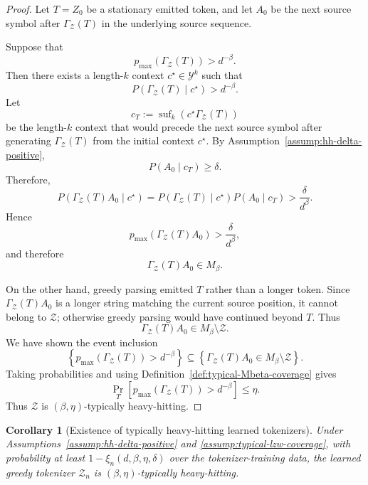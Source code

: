 \documentclass{article}
\theoremstyle{plain}
\newtheorem{corollary}[theorem]{Corollary}
\theoremstyle{definition}
\theoremstyle{remark}
\begin{document}
    \begin{proof}
    Let $T=Z_0$ be a stationary emitted token, and let $A_0$ be the next source
    symbol after $\Gamma_{\mathcal Z}(T)$ in the underlying source sequence.
    
    Suppose that
    \[
        p_{\max}\!\left(\Gamma_{\mathcal Z}(T)\right)>d^{-\beta}.
    \]
    Then there exists a length-$k$ context $c^\star\in\mathcal Y^k$ such that
    \[
        P(\Gamma_{\mathcal Z}(T)\mid c^\star)>d^{-\beta}.
    \]
    Let
    \[
        c_T
        :=
        \operatorname{suf}_k\!\left(c^\star\Gamma_{\mathcal Z}(T)\right)
    \]
    be the length-$k$ context that would precede the next source symbol after
    generating $\Gamma_{\mathcal Z}(T)$ from the initial context $c^\star$. By
    Assumption~\ref{assump:hh-delta-positive},
    \[
        P(A_0\mid c_T)\ge \delta.
    \]
    Therefore,
    \[
        P(\Gamma_{\mathcal Z}(T)A_0\mid c^\star)
        =
        P(\Gamma_{\mathcal Z}(T)\mid c^\star)
        P(A_0\mid c_T)
        >
        \frac{\delta}{d^\beta}.
    \]
    Hence
    \[
        p_{\max}\!\left(\Gamma_{\mathcal Z}(T)A_0\right)
        >
        \frac{\delta}{d^\beta},
    \]
    and therefore
    \[
        \Gamma_{\mathcal Z}(T)A_0\in M_\beta.
    \]
    
    On the other hand, greedy parsing emitted $T$ rather than a longer token. Since
    $\Gamma_{\mathcal Z}(T)A_0$ is a longer string matching the current source
    position, it cannot belong to $\mathcal Z$; otherwise greedy parsing would have
    continued beyond $T$. Thus
    \[
        \Gamma_{\mathcal Z}(T)A_0\in M_\beta\setminus\mathcal Z.
    \]
    We have shown the event inclusion
    \[
        \left\{
            p_{\max}\!\left(\Gamma_{\mathcal Z}(T)\right)>d^{-\beta}
        \right\}
        \subseteq
        \left\{
            \Gamma_{\mathcal Z}(T)A_0\in M_\beta\setminus\mathcal Z
        \right\}.
    \]
    Taking probabilities and using Definition~\ref{def:typical-Mbeta-coverage}
    gives
    \[
        \Pr_T\!\left[
            p_{\max}\!\left(\Gamma_{\mathcal Z}(T)\right)>d^{-\beta}
        \right]
        \le
        \eta.
    \]
    Thus $\mathcal Z$ is $(\beta,\eta)$-typically heavy-hitting.
    \end{proof}
    
    \begin{corollary}[Existence of typically heavy-hitting learned tokenizers]
    \label{cor:exists-typical-heavy-hitting}
    Under Assumptions~\ref{assump:hh-delta-positive} and
    \ref{assump:typical-lzw-coverage}, with probability at least
    $1-\xi_n(d,\beta,\eta,\delta)$ over the tokenizer-training data, the learned
    greedy tokenizer $\mathcal Z_n$ is $(\beta,\eta)$-typically heavy-hitting.
    \end{corollary}
    
\end{document}
